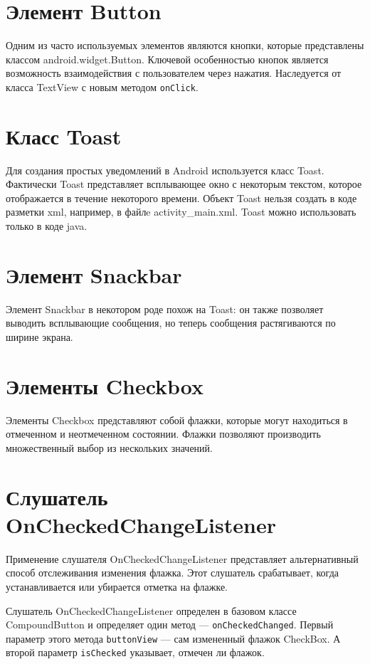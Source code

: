 \section{Элемент Button}
Одним из часто используемых элементов являются кнопки, которые 
представлены классом android.widget.Button. Ключевой особенностью кнопок 
является возможность взаимодействия с пользователем через нажатия. 
Наследуется от класса TextView с новым методом \texttt{onClick}.

\section{Класс Toast}
Для создания простых уведомлений в Android используется класс 
Toast. Фактически Toast представляет всплывающее окно с некоторым 
текстом, которое отображается в течение некоторого времени. Объект Toast 
нельзя создать в коде разметки xml, например, в файлe activity\_main.xml. 
Toast можно использовать только в коде java.

\section{Элемент Snackbar}
Элемент Snackbar в некотором роде похож на Toast: он также позволяет 
выводить всплывающие сообщения, но теперь сообщения растягиваются по 
ширине экрана.

\section{Элементы Checkbox}
Элементы Checkbox представляют собой флажки, которые могут 
находиться в отмеченном и неотмеченном состоянии. Флажки позволяют 
производить множественный выбор из нескольких значений.

\section{Слушатель OnCheckedChangeListener}
Применение слушателя OnCheckedChangeListener представляет
альтернативный способ отслеживания изменения флажка. Этот слушатель 
срабатывает, когда устанавливается или убирается отметка на флажке.\par
Слушатель OnCheckedChangeListener определен в базовом классе
CompoundButton и определяет один метод --- \texttt{onCheckedChanged}. Первый
параметр этого метода \texttt{buttonView} --- сам измененный флажок CheckBox.
А второй параметр \texttt{isChecked} указывает, отмечен ли флажок.


